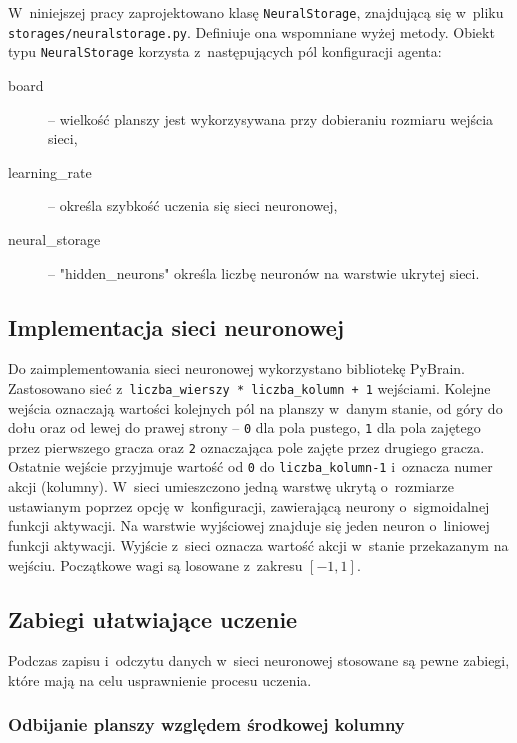 \documentclass[a4paper, 12pt, oneside]{report}
\begin{document}
 W~niniejszej pracy zaprojektowano klasę \texttt{NeuralStorage}, znajdującą się w~pliku \texttt{storages/neuralstorage.py}. Definiuje ona wspomniane wyżej metody. Obiekt typu \texttt{NeuralStorage} korzysta z~następujących pól konfiguracji agenta:

\begin{description}
\item[board] -- wielkość planszy jest wykorzysywana przy dobieraniu rozmiaru wejścia sieci,
\item[learning\_rate] -- określa szybkość uczenia się sieci neuronowej,
\item[neural\_storage] -- "hidden\_neurons" określa liczbę neuronów na warstwie ukrytej sieci.
\end{description}

\subsection{Implementacja sieci neuronowej}

Do zaimplementowania sieci neuronowej wykorzystano bibliotekę PyBrain. Zastosowano sieć z~\texttt{liczba\_wierszy * liczba\_kolumn + 1} wejściami. Kolejne wejścia oznaczają wartości kolejnych pól na planszy w~danym stanie, od góry do dołu oraz od lewej do prawej strony -- \texttt{0} dla pola pustego, \texttt{1} dla pola zajętego przez pierwszego gracza oraz \texttt{2} oznaczająca pole zajęte przez drugiego gracza. Ostatnie wejście przyjmuje wartość od \texttt{0} do \texttt{liczba\_kolumn-1} i~oznacza numer akcji (kolumny). W~sieci umieszczono jedną warstwę ukrytą o~rozmiarze ustawianym poprzez opcję w~konfiguracji, zawierającą neurony o~sigmoidalnej funkcji aktywacji. Na warstwie wyjściowej znajduje się jeden neuron o~liniowej funkcji aktywacji. Wyjście z~sieci oznacza wartość akcji w~stanie przekazanym na wejściu. Początkowe wagi są losowane z~zakresu $[-1,1]$.

\subsection{Zabiegi ułatwiające uczenie}

Podczas zapisu i~odczytu danych w~sieci neuronowej stosowane są pewne zabiegi, które mają na celu usprawnienie procesu uczenia.

\subsubsection{Odbijanie planszy względem środkowej kolumny}
\end{document}

